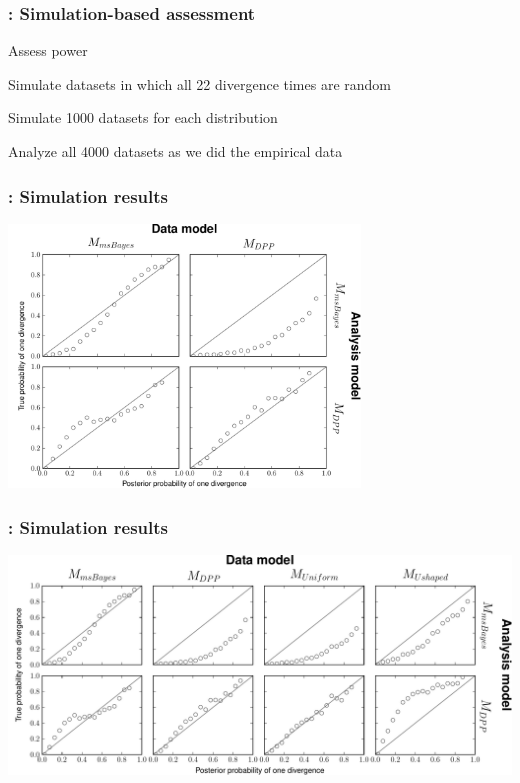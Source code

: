 \begin{frame}
    \frametitle{\dppmsbayes: Simulation-based assessment}
    Assess power \\
    \smallskip
    \begin{myitemize}
        \item Simulate datasets in which all 22 divergence times are random
        \item Simulate 1000 datasets for each \divTime{} distribution
        \item Analyze all 4000 datasets as we did the empirical data
    \end{myitemize}
\end{frame}

\begin{frame}
    \frametitle{\dppmsbayes: Simulation results}
    \centerline{
        \includegraphics[height=7.0cm]{../images/validation-model-choice-old-dpp.pdf}}
\end{frame}

\begin{frame}
    \frametitle{\dppmsbayes: Simulation results}
    \centerline{
        \includegraphics[width=1.13\textwidth]{../images/validation-model-choice-old-dpp-full.pdf}}
\end{frame}

